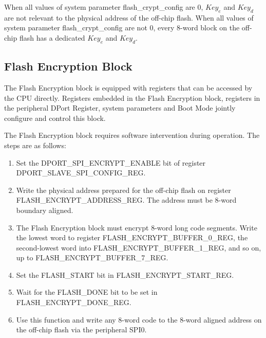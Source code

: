 \documentclass[main\_\_EN.tex]{subfiles}
\begin{document}
When all values of system parameter flash\_crypt\_config are 0, \begin{math}Key_{e}\end{math} and \begin{math}Key_{d}\end{math} are not relevant to the physical address of the off-chip flash.
When all values of system parameter flash\_crypt\_config are not 0, every 8-word block on the off-chip flash has a dedicated \begin{math}Key_{e}\end{math} and \begin{math}Key_{d}\end{math}.


\subsection{Flash Encryption Block}

The Flash Encryption block is equipped with registers that can be accessed by the CPU directly.
Registers embedded in the Flash Encryption block, registers in the peripheral DPort Register, system parameters and Boot Mode jointly configure and control this block.

The Flash Encryption block requires software intervention during operation. The steps are as follows:

\begin{enumerate}
    \item Set the DPORT\_SPI\_ENCRYPT\_ENABLE bit of register DPORT\_SLAVE\_SPI\_CONFIG\_REG.
    \item Write the physical address prepared for the off-chip flash on register FLASH\_ENCRYPT\_ADDRESS\_REG. The address must be 8-word boundary aligned.
    \setcounter{STEP_W_ADDR}{\theenumi}
    \item  The Flash Encryption block must encrypt 8-word long code segments. Write the lowest word to register FLASH\_ENCRYPT\_BUFFER\_0\_REG,
    the second-lowest word into FLASH\_ENCRYPT\_BUFFER\_1\_REG, and so on, up to  FLASH\_ENCRYPT\_BUFFER\_7\_REG.
    \item Set the FLASH\_START bit in FLASH\_ENCRYPT\_START\_REG.
    \item Wait for the FLASH\_DONE bit to be set in FLASH\_ENCRYPT\_DONE\_REG.
    \setcounter{STEP_POLL}{\theenumi}
    \item Use this function and write any 8-word code to the 8-word aligned address on the off-chip flash via the peripheral SPI0.
    \setcounter{STEP_W_FLASH}{\theenumi}
\end{enumerate}
\end{document}
